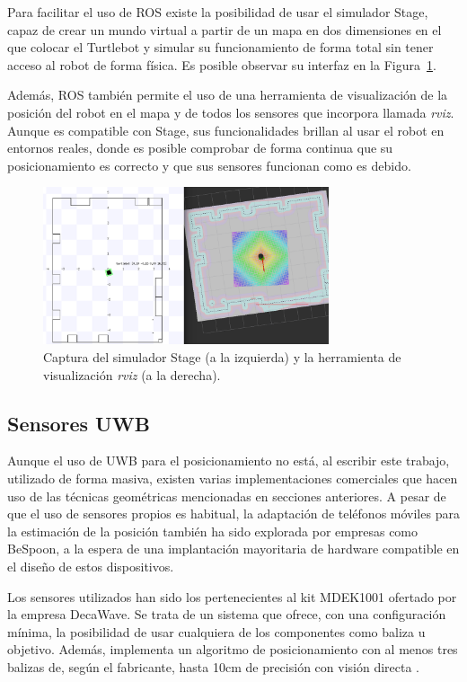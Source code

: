 Para facilitar el uso de ROS existe la posibilidad de usar el simulador Stage, capaz de crear un mundo virtual a partir de un mapa en dos dimensiones en el que colocar el Turtlebot y simular su funcionamiento de forma total sin tener acceso al robot de forma física.
Es posible observar su interfaz en la Figura~\ref{fig:stage_rviz}.

Además, ROS también permite el uso de una herramienta de visualización de la posición del robot en el mapa y de todos los sensores que incorpora llamada \textit{rviz}.
Aunque es compatible con Stage, sus funcionalidades brillan al usar el robot en entornos reales, donde es posible comprobar de forma continua que su posicionamiento es correcto y que sus sensores funcionan como es debido.

\begin{figure}[H]
    \centering
    \includegraphics[width=0.75\textwidth]{pic/Stage-rviz.png}
    \caption{Captura del simulador Stage (a la izquierda) y la herramienta de visualización \textit{rviz} (a la derecha).}
    \label{fig:stage_rviz}
\end{figure}

\subsection{Sensores UWB}

Aunque el uso de UWB para el posicionamiento no está, al escribir este trabajo, utilizado de forma masiva, existen varias implementaciones comerciales que hacen uso de las técnicas geométricas mencionadas en secciones anteriores.
A pesar de que el uso de sensores propios es habitual, la adaptación de teléfonos móviles para la estimación de la posición también ha sido explorada por empresas como BeSpoon, a la espera de una implantación mayoritaria de hardware compatible en el diseño de estos dispositivos.

Los sensores utilizados han sido los pertenecientes al kit MDEK1001 ofertado por la empresa DecaWave.
Se trata de un sistema que ofrece, con una configuración mínima, la posibilidad de usar cualquiera de los componentes como baliza u objetivo.
Además, implementa un algoritmo de posicionamiento con al menos tres balizas de, según el fabricante, hasta 10cm de precisión con visión directa \cite{Decawave}.

